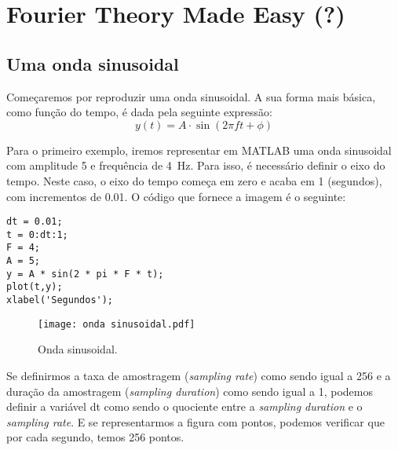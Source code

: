 \chapter{Fourier Theory Made Easy (?)}
\section{Uma onda sinusoidal}

Começaremos por reproduzir uma onda sinusoidal. A sua forma mais básica, como função do tempo, é dada pela seguinte expressão:
\begin{equation}
    y(t) = A\cdot \sin \left(2\pi f t + \phi\right)
\end{equation}

Para o primeiro exemplo, iremos representar em MATLAB uma onda sinusoidal com amplitude 5 e frequência de 4~Hz. Para isso, é necessário definir o eixo do tempo. Neste caso, o eixo do tempo começa em zero e acaba em 1 (segundos), com incrementos de 0.01. O código que fornece a imagem é o seguinte:

\newpara

\begin{lstlisting}[style=Matlab-editor, basicstyle=\small, label={lst: onda sinusoidal}]
dt = 0.01;
t = 0:dt:1;
F = 4;
A = 5;
y = A * sin(2 * pi * F * t);
plot(t,y);
xlabel('Segundos');
\end{lstlisting}

\begin{figure}[!ht]
\centering
\texttt{[image: onda sinusoidal.pdf]}
\caption{Onda sinusoidal.}
\label{fig:onda sinusoidal}
\end{figure}

\newpage

Se definirmos a taxa de amostragem (\emph{sampling rate}) como sendo igual a 256 e a duração da amostragem (\emph{sampling duration}) como sendo igual a 1, podemos definir a variável dt como sendo o quociente entre a \emph{sampling duration} e o \emph{sampling rate}. E se representarmos a figura com pontos, podemos verificar que por cada segundo, temos 256 pontos.

